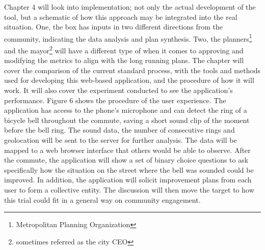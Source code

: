 Chapter 4 will look into implementation; not only the actual development of the tool, but a schematic of how this approach may be integrated into the real situation. 
 One, the box has inputs in two different directions from the community, indicating the data analysis and plan synthesis. Two, the planners\footnote{Metropolitan Planning Organization} and the mayor\footnote{sometimes referred as the city CEO} will have a different type of  when it comes to approving and modifying the metrics to align with the long running plans. The chapter will cover the comparison of the current standard process, with the tools and methods used for developing this web-based application, and the procedure of how it will work. It will also cover the  experiment conducted to see the application's performance. Figure 6 shows the procedure of the user experience. The application has access to the phone's microphone and can detect the ring of a bicycle bell throughout the commute, saving a short sound clip of the moment before the bell ring. The sound data, the number of consecutive rings and geolocation will be sent to the server for further analysis. The data will be mapped to a web browser interface that others would be able to observe. After the commute, the application will show a set of binary choice questions to ask specifically how the situation on the street where the bell was sounded could be improved. In addition, the application will solicit improvement plans from each user to form a collective entity. The discussion will then move the target to how this trial could fit in a general way on community engagement.

